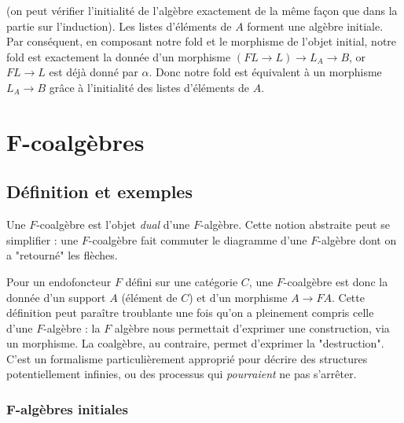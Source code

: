 \documentclass{article}
\begin{document}
(on peut vérifier l'initialité de l'algèbre exactement de la même façon que dans la partie sur l'induction). Les listes d'éléments de $A$ forment une algèbre initiale. Par conséquent, en composant notre fold et le morphisme de l'objet initial, notre fold est exactement la donnée  d'un morphisme $(FL \rightarrow L) \rightarrow L_A \rightarrow B $, or $FL \rightarrow L$ est déjà donné par $\alpha$. Donc notre fold est équivalent à un morphisme $L_A \rightarrow B$ grâce à l'initialité des listes d'éléments de $A$.

\section{F-coalgèbres}

\subsection{Définition et exemples}

Une $F$-coalgèbre est l'objet \textit{dual} d'une $F$-algèbre. Cette notion abstraite peut se simplifier : une $F$-coalgèbre fait commuter le diagramme d'une $F$-algèbre dont on a "retourné" les flèches.

\begin{center}
\end{center}

Pour un endofoncteur $F$ défini sur une catégorie $C$, une $F$-coalgèbre est donc la donnée d'un support $A$ (élément de $C$) et d'un morphisme $A \rightarrow FA$. Cette définition peut paraître troublante une fois qu'on a pleinement compris celle d'une $F$-algèbre : la $F$ algèbre nous permettait d'exprimer une construction, via un morphisme. La coalgèbre, au contraire, permet d'exprimer la "destruction". C'est un formalisme particulièrement approprié  pour décrire des structures potentiellement infinies, ou des processus qui \textit{pourraient} ne pas s'arrêter.

\subsubsection{F-algèbres initiales}
\end{document}
